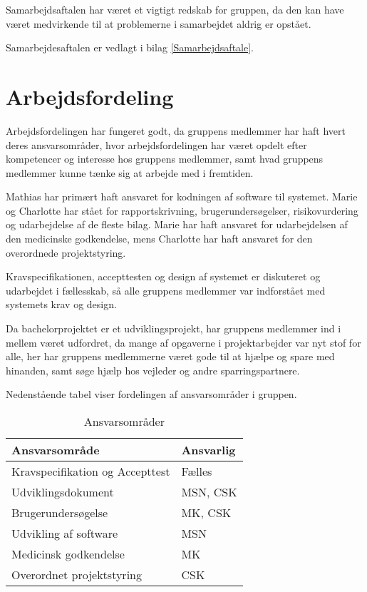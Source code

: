 Samarbejdsaftalen har været et vigtigt redskab for gruppen, da den kan have været medvirkende til at problemerne i samarbejdet aldrig er opstået. 

Samarbejdesaftalen er vedlagt i bilag \ref{Samarbejdsaftale}. 

\section{Arbejdsfordeling}
Arbejdsfordelingen har fungeret godt, da gruppens medlemmer har haft hvert deres ansvarsområder, hvor arbejdsfordelingen har været opdelt efter kompetencer og interesse hos gruppens medlemmer, samt hvad gruppens medlemmer kunne tænke sig at arbejde med i fremtiden.  

Mathias har primært haft ansvaret for kodningen af software til systemet. Marie og Charlotte har stået for rapportskrivning, brugerundersøgelser, risikovurdering og udarbejdelse af de fleste bilag. Marie har haft ansvaret for udarbejdelsen af den medicinske godkendelse, mens Charlotte har haft ansvaret for den overordnede projektstyring. 

Kravspecifikationen, accepttesten og design af systemet er diskuteret og udarbejdet i fællesskab, så alle gruppens medlemmer var indforstået med systemets krav og design. 

Da bachelorprojektet er et udviklingsprojekt, har gruppens medlemmer ind i mellem været udfordret, da mange af opgaverne i projektarbejder var nyt stof for alle, her har gruppens medlemmerne været gode til at hjælpe og spare med hinanden, samt søge hjælp hos vejleder og andre sparringspartnere.  

Nedenstående tabel viser fordelingen af ansvarsområder i gruppen. 

\begin{table}[h]
\centering
\begin{tabular}{|l| p{}|}
\hline
\textbf{Ansvarsområde} &  \textbf{Ansvarlig} \\\hline
Kravspecifikation og Accepttest & Fælles \\\hline
Udviklingsdokument & MSN, CSK\\\hline
Brugerundersøgelse & MK, CSK \\\hline
Udvikling af software & MSN\\\hline
Medicinsk godkendelse & MK \\\hline
Overordnet projektstyring & CSK \\\hline
\end{tabular}
\caption{Ansvarsområder}
\end{table}

